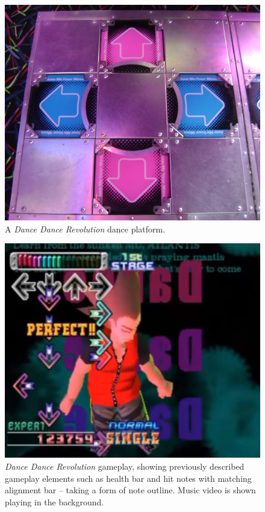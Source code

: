\begin{figure}[h]
    \centering\includegraphics[scale=0.2]{obrazki/ddrplatform.png}
    \caption{A \textit{Dance Dance Revolution} dance platform. \cite{ddrplatform}}
    \label{fig:ddr_platform}
\end{figure}

\begin{figure}[h]
    \centering\includegraphics[scale=0.2]{obrazki/ddrgameplay.jpg}
    \caption{\textit{Dance Dance Revolution} gameplay, showing previously described gameplay elements such as health bar and hit notes with matching alignment bar -- taking a form of note outline. Music video is shown playing in the background. \cite{ddrgameplay}}
    \label{fig:ddr_gameplay}
\end{figure}
\pagebreak

